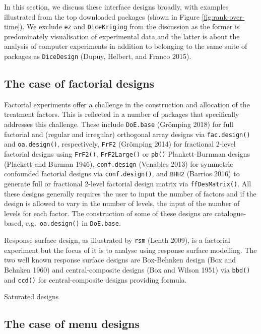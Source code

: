 \documentclass{article}
\begin{document}
In this section, we discuss these interface designs broadly, with
examples illustrated from the top downloaded packages (shown in Figure
\ref{fig:rank-over-time}). We exclude \texttt{ez} and
\texttt{DiceKriging} from the discussion as the former is predominately
visualisation of experimental data and the latter is about the analysis
of computer experiments in addition to belonging to the same suite of
packages as \texttt{DiceDesign} (Dupuy, Helbert, and Franco 2015).

\hypertarget{the-case-of-factorial-designs}{%
\subsection{The case of factorial
designs}\label{the-case-of-factorial-designs}}

Factorial experiments offer a challenge in the construction and
allocation of the treatment factors. This is reflected in a number of
packages that specifically addresses this challenge. These include
\texttt{DoE.base} (Grömping 2018) for full factorial and (regular and
irregular) orthogonal array designs via \texttt{fac.design()} and
\texttt{oa.design()}, respectively, \texttt{FrF2} (Grömping 2014) for
fractional 2-level factorial designs using \texttt{FrF2()},
\texttt{FrF2Large()} or \texttt{pb()} Plankett-Burnman designs (Plackett
and Burman 1946), \texttt{conf.design} (Venables 2013) for symmetric
confounded factorial designs via \texttt{conf.design()}, and
\texttt{BHH2} (Barrios 2016) to generate full or fractional 2-level
factorial design matrix via \texttt{ffDesMatrix()}. All these designs
generally requires the user to input the number of factors and if the
design is allowed to vary in the number of levels, the input of the
number of levels for each factor. The construction of some of these
designs are catalogue-based, e.g.~\texttt{oa.design()} in
\texttt{DoE.base}.

Response surface design, as illustrated by \texttt{rsm} (Lenth 2009), is
a factorial experiment but the focus of it is to analyse using response
surface modelling. The two well known response surface designs are
Box-Behnken design (Box and Behnken 1960) and central-composite designs
(Box and Wilson 1951) via \texttt{bbd()} and \texttt{ccd()} for
central-composite designs providing formula.

Saturated designs

\hypertarget{the-case-of-menu-designs}{%
\subsection{The case of menu designs}\label{the-case-of-menu-designs}}
\end{document}

